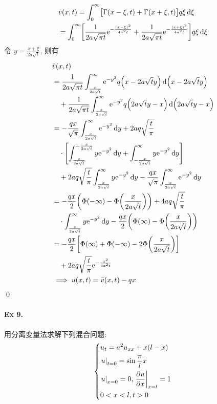 \begin{solution}
\begin{align*}
&\bar{v}(x, t) = \int_0^\infty
    \bigl[ \Gamma(x-\xi, t) + \Gamma(x+\xi, t) \bigr] q \xi \operatorname{d\!} \xi \\
&= \int_0^\infty
    \biggl[ \frac1{2a\sqrt{\pi t}} {\mathrm e}^{-\frac{(x-\xi)^2}{4a^2t}}
    +\frac1{2a\sqrt{\pi t}} {\mathrm e}^{-\frac{(x+\xi)^2}{4a^2t}} \biggr]
	q \xi \operatorname{d\!} \xi
\end{align*}
令 $y = \frac{x+\xi}{2a\sqrt{t}}$, 则有
\begin{align*}
&\bar{v}(x, t) \\
&= \frac1{2a\sqrt{\pi t}} 
    \int_{\frac{x}{2a\sqrt{t}}}^\infty \me^{-y^2}q
        \mclosure{ x - 2a\sqrt{t} y } \diff \mclosure{ x - 2a\sqrt{t} y } \\
    &\quad+\frac1{2a\sqrt{\pi t}}
    \int_{\frac{x}{2a\sqrt{t}}}^\infty \me^{-y^2}q
        \mclosure{ 2a\sqrt{t} y - x } \diff \mclosure{ 2a\sqrt{t} y - x } \\
&= -\frac{qx}{\sqrt{\pi}} \int_{\frac{x}{2a\sqrt{t}}}^\infty \me^{-y^2} \diff y
    + 2aq\sqrt{\frac{t}{\pi}} \\
    &\quad\cdot \Biggl[
        \int_{\frac{x}{2a\sqrt{t}}}^{-\frac{x}{2a\sqrt{t}}} y\me^{-y^2}\diff y
        + \int_{-\frac{x}{2a\sqrt{t}}}^\infty y\me^{-y^2}\diff y \Biggr] \\
    &\quad+ 2aq\sqrt{\frac{t}{\pi}}
	    \int_{\frac{x}{2a\sqrt{t}}}^\infty y\me^{-y^2}\diff y
        - \frac{qx}{\sqrt{\pi}} \int_{\frac{x}{2a\sqrt{t}}}^\infty
		\me^{-y^2} \diff y \\
&= -\frac{qx}{2}\mclosure{\Phi(-\infty) - \Phi\mclosure{\frac{x}{2a\sqrt{t}}}}
    + 4aq\sqrt{\frac{t}{\pi}} \\
    &\quad\cdot\int_{\frac{x}{2a\sqrt{t}}}^\infty y\me^{-y^2} \diff y
        - \frac{qx}{2}\mclosure{\Phi(\infty)
		- \Phi\mclosure{\frac{x}{2a\sqrt{t}}}}\\
&= -\frac{qx}{2}\biggl[ \Phi(\infty) + \Phi(-\infty)
    - 2\Phi\mclosure{\frac{x}{2a\sqrt{t}}} \biggr] \\
    &\quad+ 2aq\sqrt{\frac{t}{\pi}} \me^{-\frac{x^2}{4a^2t}} \\
&\implies u(x, t) = \bar{v}(x, t) - qx
\end{align*}
\qed
\end{solution}
\paragraph{Ex 9.}
用分离变量法求解下列混合问题:
\[ \begin{dcases}
u_t = a^2 u_{xx} + x(l-x) \\
{\left.{u} \right|}_{t=0} = \sin \dfrac{\pi}{l} x \\
{\left.{u} \right|}_{x=0} = 0, {\left.{{\dfrac{\partial {u}}{\partial {x}}}} \right|}_{x=l} = 1 \\
0 < x < l, t > 0
\end{dcases} \]

